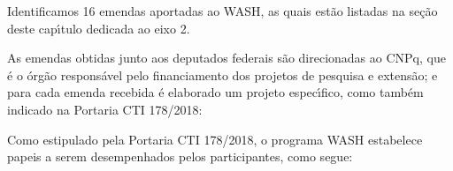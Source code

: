 \documentclass[
12pt,		%
openright,	%
twoside,  %
a4paper,			%
chapter=TITLE,		%
english,			%
french,				%
spanish,			%
brazil				%
]{USPSC-classe/USPSC}
\begin{document}
Identificamos 16 emendas aportadas ao WASH, as quais est\~ao listadas na se\c{c}\~ao deste cap\'{\i}tulo dedicada ao eixo 2.








As emendas obtidas junto aos deputados federais s\~ao direcionadas ao CNPq, que \'e o \'org\~ao respons\'avel pelo financiamento dos projetos de pesquisa e extens\~ao;  e para cada emenda recebida \'e elaborado um projeto espec\'{\i}fico, como tamb\'em indicado na Portaria CTI 178/2018:









\noindent\begin{center}\mbox{\centering{}}\end{center}


Como estipulado pela Portaria CTI 178/2018, o programa WASH estabelece papeis a serem desempenhados pelos participantes, como segue:
\end{document}
